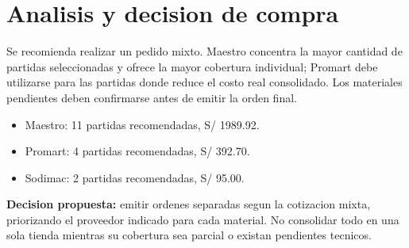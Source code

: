 \documentclass[11pt,a4paper]{article}
\begin{document}
\section{Analisis y decision de compra}
Se recomienda realizar un pedido mixto. Maestro concentra la mayor cantidad de partidas seleccionadas y ofrece la mayor cobertura individual; Promart debe utilizarse para las partidas donde reduce el costo real consolidado. Los materiales pendientes deben confirmarse antes de emitir la orden final.

\begin{itemize}
\item Maestro: 11 partidas recomendadas, S/ 1989.92.
\item Promart: 4 partidas recomendadas, S/ 392.70.
\item Sodimac: 2 partidas recomendadas, S/ 95.00.
\end{itemize}

\textbf{Decision propuesta:} emitir ordenes separadas segun la cotizacion mixta, priorizando el proveedor indicado para cada material. No consolidar todo en una sola tienda mientras su cobertura sea parcial o existan pendientes tecnicos.
\end{document}
